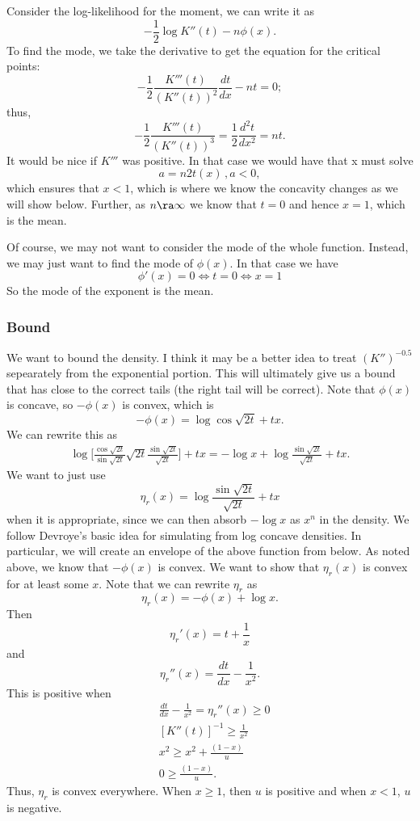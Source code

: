 \documentclass[12pt]{article}
\newcommand{\dd}[2]{\frac{d #1}{d #2}}
\begin{document}
Consider the log-likelihood for the moment, we can write it as
\[
- \frac{1}{2} \log K''(t) - n \phi(x).
\]
To find the mode, we take the derivative to get the equation for the critical
points:
\[
-\frac{1}{2} \frac{K'''(t)}{(K''(t))^2} \dd{t}{x} - n t = 0;
\]
thus,
\[
- \frac{1}{2} \frac{K'''(t)}{(K''(t))^3} = \frac{1}{2} \dd{^2 t}{x^2} = n t.
\]
It would be nice if $K'''$ was positive.  In that case we would have that x must
solve
\[
a = n 2t(x) \, , a < 0,
\]
which ensures that $x < 1$, which is where we know the concavity changes as we
will show below.  Further, as $n \ra \infty$ we know that $t = 0$ and hence $x =
1$, which is the mean.

Of course, we may not want to consider the mode of the whole function.  Instead,
we may just want to find the mode of $\phi(x)$.  In that case we have
\[
\phi'(x) = 0 \iff t = 0 \iff x = 1
\]
So the mode of the exponent is the mean.

\subsubsection{Bound}

We want to bound the density.  I think it may be a better idea to treat
$(K'')^{-0.5}$ sepearately from the exponential portion.  This will ultimately
give us a bound that has close to the correct tails (the right tail will be
correct).  Note that $\phi(x)$ is concave, so $-\phi(x)$ is convex, which is
\[
- \phi(x) = \log \cos \sqrt{2t} + tx.
\]
We can rewrite this as
\begin{align*}
  \log \Big[ \frac{\cos \sqrt{2t}}{\sin \sqrt{2t}} \sqrt{2t} \frac{\sin
    \sqrt{2t}}{\sqrt{2t}} \Big] + tx
= - \log x + \log \frac{\sin \sqrt{2t}}{\sqrt{2t}} + tx.
\end{align*}
We want to just use
\[
\eta_r(x) = \log \frac{\sin \sqrt{2t}}{\sqrt{2t}} + tx
\]
when it is appropriate, since we can then absorb $-\log x$ as $x^n$ in the
density.  We follow Devroye's basic idea for simulating from log concave
densities.  In particular, we will create an envelope of the above function from
below.  As noted above, we know that $-\phi(x)$ is convex.  We want to show that
$\eta_r(x)$ is convex for at least some $x$.  Note that we can rewrite $\eta_r$ as
\[
\eta_r(x) = - \phi(x) + \log x.
\]
Then
\[
\eta_r'(x) = t + \frac{1}{x}
\]
and
\[
\eta_r''(x) = \dd{t}{x} - \frac{1}{x^2}.
\]
This is positive when
\begin{align*}
& \dd{t}{x} - \frac{1}{x^2}  = \eta_r''(x) \geq 0 \\
& [K''(t)]^{-1}  \geq \frac{1}{x^2} \\
& x^2  \geq x^2 + \frac{(1-x)}{u} \\
& 0 \geq \frac{(1-x)}{u}.
\end{align*}
Thus, $\eta_r$ is convex everywhere.  When $x \geq 1$, then $u$ is positive and
when $x < 1$, $u$ is negative.
\end{document}
